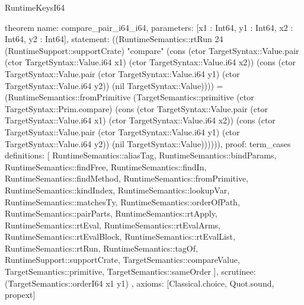 \begin{lexlean}{RuntimeKeysI64}
\begin{semanticmodule}
theorem{
  name: compare_pair_i64_i64,
  parameters: [x1 : Int64, y1 : Int64, x2 : Int64, y2 : Int64],
  statement: ((RuntimeSemantics::rtRun 24 (RuntimeSupport::supportCrate) "compare" (cons (ctor TargetSyntax::Value.pair (ctor TargetSyntax::Value.i64 x1) (ctor TargetSyntax::Value.i64 x2)) (cons (ctor TargetSyntax::Value.pair (ctor TargetSyntax::Value.i64 y1) (ctor TargetSyntax::Value.i64 y2)) (nil TargetSyntax::Value)))) = (RuntimeSemantics::fromPrimitive (TargetSemantics::primitive (ctor TargetSyntax::Prim.compare) (cons (ctor TargetSyntax::Value.pair (ctor TargetSyntax::Value.i64 x1) (ctor TargetSyntax::Value.i64 x2)) (cons (ctor TargetSyntax::Value.pair (ctor TargetSyntax::Value.i64 y1) (ctor TargetSyntax::Value.i64 y2)) (nil TargetSyntax::Value)))))),
  proof: term_cases{
    definitions: [
      RuntimeSemantics::aliasTag,
      RuntimeSemantics::bindParams,
      RuntimeSemantics::findFree,
      RuntimeSemantics::findIn,
      RuntimeSemantics::findMethod,
      RuntimeSemantics::fromPrimitive,
      RuntimeSemantics::kindIndex,
      RuntimeSemantics::lookupVar,
      RuntimeSemantics::matchesTy,
      RuntimeSemantics::orderOfPath,
      RuntimeSemantics::pairParts,
      RuntimeSemantics::rtApply,
      RuntimeSemantics::rtEval,
      RuntimeSemantics::rtEvalArms,
      RuntimeSemantics::rtEvalBlock,
      RuntimeSemantics::rtEvalList,
      RuntimeSemantics::rtRun,
      RuntimeSemantics::tagOf,
      RuntimeSupport::supportCrate,
      TargetSemantics::compareValue,
      TargetSemantics::primitive,
      TargetSemantics::sameOrder
    ],
    scrutinee: (TargetSemantics::orderI64 x1 y1)
  },
  axioms: [Classical.choice, Quot.sound, propext]
}
\end{semanticmodule}
\end{lexlean}
